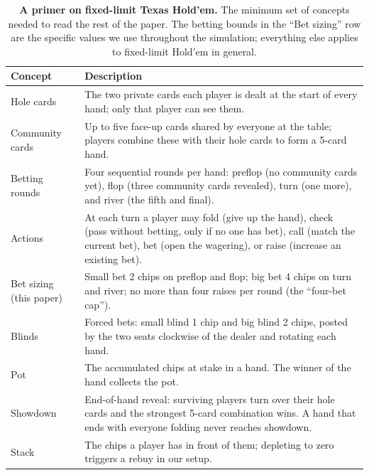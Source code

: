 \documentclass[10pt]{article} %
\begin{document}
\begin{table}[t]
\centering
{}
\caption{\textbf{A primer on fixed-limit Texas Hold'em.} The
minimum set of concepts needed to read the rest of the paper. The
betting bounds in the ``Bet sizing'' row are the specific values
we use throughout the simulation; everything else applies to
fixed-limit Hold'em in general.}
\label{tab:poker-primer}
\small
\begin{tabularx}{\textwidth}{@{}lX@{}}
\toprule
Concept & Description \\
\midrule
Hole cards & The two private cards each player is dealt at the start of every hand; only that player can see them. \\
Community cards & Up to five face-up cards shared by everyone at the table; players combine these with their hole cards to form a 5-card hand. \\
Betting rounds & Four sequential rounds per hand: preflop (no community cards yet), flop (three community cards revealed), turn (one more), and river (the fifth and final). \\
Actions & At each turn a player may fold (give up the hand), check (pass without betting, only if no one has bet), call (match the current bet), bet (open the wagering), or raise (increase an existing bet). \\
Bet sizing (this paper) & Small bet 2 chips on preflop and flop; big bet 4 chips on turn and river; no more than four raises per round (the ``four-bet cap''). \\
Blinds & Forced bets: small blind 1 chip and big blind 2 chips, posted by the two seats clockwise of the dealer and rotating each hand. \\
Pot & The accumulated chips at stake in a hand. The winner of the hand collects the pot. \\
Showdown & End-of-hand reveal: surviving players turn over their hole cards and the strongest 5-card combination wins. A hand that ends with everyone folding never reaches showdown. \\
Stack & The chips a player has in front of them; depleting to zero triggers a rebuy in our setup. \\
\bottomrule
\end{tabularx}
\end{table}
\end{document}

